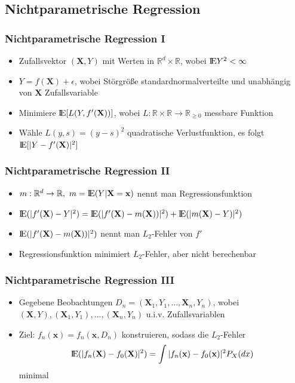 \documentclass[hyperref={pdfpagelabels=false}]{beamer}
\begin{document}
\subsection{Nichtparametrische Regression}
\begin{frame}
\frametitle{Nichtparametrische Regression \RN{1}}
\begin{itemize}
\item Zufallsvektor $(\mathbf{X},Y)$ mit Werten in $\mathbb{R}^d \times \mathbb{R}$, wobei $\mbox{I\negthinspace E} Y^2 < \infty$
\item  $Y = f(\mathbf{X}) + \epsilon$, wobei Störgröße standardnormalverteilte und unabhängig von $\mathbf{X}$  Zufallsvariable
\item Minimiere $\mbox{I\negthinspace E}[L(Y,f'(\mathbf{X}))]$, wobei $L: \mathbb{R} \times \mathbb{R} \rightarrow \mathbb{R}_{\geq 0}$ messbare Funktion
\item Wähle $L(y,s) = (y-s)^2$ quadratische Verlustfunktion, es folgt $\mbox{I\negthinspace E}[\vert Y - f'(\mathbf{X})\vert ^2]$
\end{itemize}
\end{frame}

\begin{frame}
\frametitle{Nichtparametrische Regression \RN{2}}
\begin{itemize}
\item $m:\mathbb{R}^d \to \mathbb{R},\ m = \mbox{I\negthinspace E} (Y \vert \mathbf{X} = \mathbf{x})$ nennt man Regressionsfunktion
\item $\mbox{I\negthinspace E} (\vert f'(\mathbf{X})-Y\vert^2) = \mbox{I\negthinspace E} (\vert f'(\mathbf{X}) - m(\mathbf{X})) \vert ^2 ) + \mbox{I\negthinspace E} (\vert m(\mathbf{X}) - Y) \vert ^2 )$
\item $\mbox{I\negthinspace E} (\vert f'(\mathbf{X}) - m(\mathbf{X})) \vert ^2 )$ nennt man $L_2$-Fehler von $f'$
\item Regressionsfunktion minimiert $L_2$-Fehler, aber nicht berechenbar
\end{itemize}
\end{frame}

\begin{frame}
\frametitle{Nichtparametrische Regression \RN{3}}
\begin{itemize}
\item Gegebene Beobachtungen $D_n = {(\mathbf{X}_1, Y_ 1, ..., \mathbf{X}_n,Y_n)}$, wobei $(\mathbf{X},Y), (\mathbf{X}_1, Y_ 1), ..., (\mathbf{X}_n,Y_n)$ u.i.v. Zufallsvariablen 
\item Ziel: $f_n(\mathbf{x}) = f_n(\mathbf{x},D_n)$ konstruieren, sodass die $L_2$-Fehler 
\begin{equation*}
\mbox{I\negthinspace E} (\vert f_n(\mathbf{X})-f_0(\mathbf{X})\vert^2) = \int \vert f_n(\mathbf{x})-f_0(\mathbf{x})\vert ^2 P _X(dx)
\end{equation*} minimal 
\end{itemize}
\end{frame}
\end{document}
